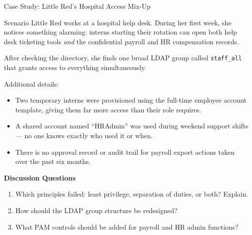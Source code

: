 \documentclass[aspectratio=169]{beamer}  %
\begin{document}
\begin{frame}{Case Study: Little Red's Hospital Access Mix-Up}
    \begin{block}{Scenario}
        \footnotesize
        Little Red works at a hospital help desk. During her first week, she notices something alarming: interns starting their rotation can open both help desk ticketing tools \emph{and} the confidential payroll and HR compensation records.

        After checking the directory, she finds one broad LDAP group called \texttt{staff\_all} that grants access to everything simultaneously.

        Additional details:
        \begin{itemize}
            \item Two temporary interns were provisioned using the full-time employee account template, giving them far more access than their role requires.
            \item A shared account named ``HRAdmin'' was used during weekend support shifts --- no one knows exactly who used it or when.
            \item There is no approval record or audit trail for payroll export actions taken over the past six months.
        \end{itemize}
    \end{block}
    \textbf{Discussion Questions}
    \begin{enumerate}
        \item Which principles failed: least privilege, separation of duties, or both? Explain.
        \item How should the LDAP group structure be redesigned?
        \item What PAM controls should be added for payroll and HR admin functions?
    \end{enumerate}
\end{frame}
\end{document}
